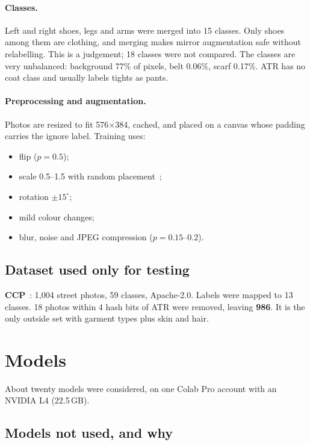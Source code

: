 \documentclass[conference,a4paper]{IEEEtran}
\begin{document}
\paragraph{Classes.} Left and right shoes, legs and arms were merged into 15 classes. Only shoes among them are clothing, and merging makes mirror augmentation safe without relabelling. This is a judgement; 18 classes were not compared. The classes are very unbalanced: background 77\% of pixels, belt 0.06\%, scarf 0.17\%. ATR has no coat class and usually labels tights as pants.

\paragraph{Preprocessing and augmentation.} Photos are resized to fit 576$\times$384, cached, and placed on a canvas whose padding carries the ignore label. Training uses:
\begin{itemize}
  \item flip ($p=0.5$);
  \item scale 0.5--1.5 with random placement~\cite{ce2p};
  \item rotation $\pm15^\circ$;
  \item mild colour changes;
  \item blur, noise and JPEG compression ($p=0.15$--$0.2$).
\end{itemize}

\subsection{Dataset used only for testing}
\textbf{CCP}~\cite{ccp}: 1,004 street photos, 59 classes, Apache-2.0. Labels were mapped to 13 classes. 18 photos within 4 hash bits of ATR were removed, leaving \textbf{986}. It is the only outside set with garment types plus skin and hair.

\section{Models}
\label{sec:models}

About twenty models were considered, on one Colab Pro account with an NVIDIA L4 (22.5\,GB).

\subsection{Models not used, and why}
\end{document}
